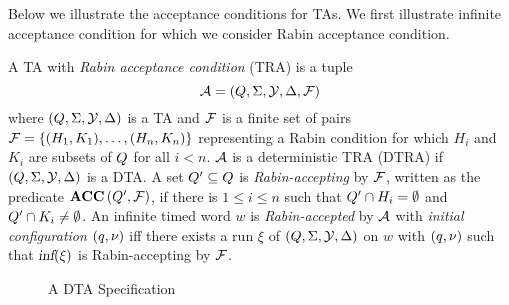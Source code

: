 Below we illustrate the acceptance conditions for TAs.
We first illustrate infinite acceptance condition for which
we consider Rabin acceptance condition.


\begin{definition}
A TA with \emph{Rabin acceptance condition} (TRA) is a tuple
\begin{equation}\label{eq:tra}
    \mathcal{A}=(Q,\Sigma,\mathcal{Y},\Delta,\mathcal{F})
\end{equation}
where $(Q,\Sigma,\mathcal{Y},\Delta)$ is a TA and $\mathcal{F}$ is a finite
set of pairs
$
    \mathcal{F}
        = \{
            (H_1,K_1 ),
            \dots,
            (H_n,K_n)
        \}
$ representing a Rabin condition for which
$H_i$ and $K_i$ are subsets of $Q$ for all $i<n$.
$\mathcal{A}$ is a deterministic TRA (DTRA) if $(Q,\Sigma,\mathcal{Y},\Delta)$ is a DTA.
A set $Q' \subseteq Q $ is \emph{Rabin-accepting} by $\mathcal{F}$,
written as the predicate $\mbox{\bf ACC} \left( {Q'}, {\mathcal{F}} \right)$,
if there is $ 1 \leq i \leq n$ such that $ Q' \cap H_i= \emptyset $
and $ Q' \cap K_i \neq \emptyset $. An infinite timed word $w$ is \emph{Rabin-accepted} by
$\mathcal{A}$ with \emph{initial configuration} $(q,\nu)$ iff there exists a run $\xi$ of $(Q,\Sigma,\mathcal{Y},\Delta)$ on $w$ with $(q,\nu)$ such that
$
    \mbox{\sl inf} ( 
         \xi
     )
$ is Rabin-accepting by $\mathcal{F}$.
\end{definition}

\begin{figure}
    \centering
    \resizebox{.5\textwidth}{!}{
        
        }
    \caption{A DTA Specification}
    \label{fig:dta}
\end{figure}

